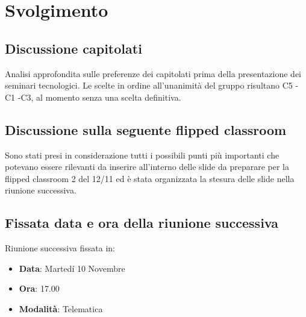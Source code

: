 \documentclass[]{article}
\begin{document}
	\newpage

	\section{Svolgimento}
	\subsection{Discussione capitolati}
	 Analisi approfondita sulle preferenze dei capitolati prima della presentazione dei seminari tecnologici. Le scelte in ordine all'unanimità del gruppo risultano C5 - C1 -C3, al momento senza una scelta definitiva.

	\subsection{Discussione sulla seguente flipped classroom}
	Sono stati presi in considerazione tutti i possibili punti più importanti che potevano essere rilevanti da inserire all'interno delle slide da preparare per la flipped classroom 2  del 12/11 ed è stata organizzata la stesura delle slide nella riunione successiva.
	\subsection{Fissata data e ora della riunione successiva}
	Riunione successiva fissata in:
	\begin{itemize}
		\item \textbf{Data}: Martedí 10 Novembre
		\item \textbf{Ora}: 17.00
		\item \textbf{Modalità}: Telematica
	\end{itemize}

	
\end{document}
